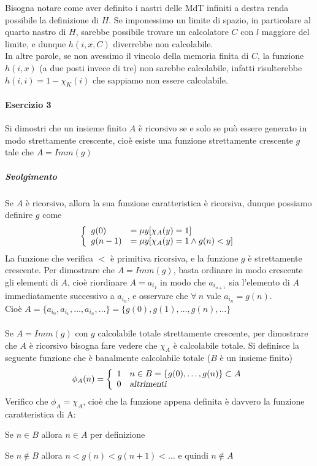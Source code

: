 \documentclass[10pt]{book}
\begin{document}
Bisogna notare come aver definito i nastri delle MdT infiniti a destra renda possibile la definizione di $H$. Se imponessimo un limite di spazio, in particolare al quarto nastro di $H$, sarebbe possibile trovare un calcolatore $C$ con $l$ maggiore del limite, e dunque $h(i,x,C)$ diverrebbe non calcolabile.\\
In altre parole, se non avessimo il vincolo della memoria finita di $C$, la funzione $h(i,x)$ (a due posti invece di tre) non sarebbe calcolabile, infatti risulterebbe $h(i,i) = 1 - \chi_K(i)$ che sappiamo non essere calcolabile.
\paragraph{Esercizio 3} Si dimostri che un insieme finito $A$ è ricorsivo se e solo se può essere generato in modo strettamente crescente, cioè esiste una funzione strettamente crescente $g$ tale che $A = Imm(g)$
\subparagraph{Svolgimento}
Se $A$ è ricorsivo, allora la sua funzione caratteristica è ricorsiva, dunque possiamo definire $g$ come $$\left\{\begin{array}{l l}
g(0)&=\mu y[\chi_A(y) = 1]\\
g(n-1)&=\mu y[\chi_A(y) = 1 \wedge g(n) < y]
\end{array}\right.$$
La funzione che verifica $<$ è primitiva ricorsiva, e la funzione $g$ è strettamente crescente. Per dimostrare che $A = Imm(g)$, basta ordinare in modo crescente gli elementi di $A$, cioè riordinare $A = {a_i}_i$ in modo che $a_{i_{n+1}}$ sia l'elemento di $A$ immediatamente successivo a $a_{i_n}$, e osservare che $\forall\:n$ vale $a_{i_n} = g(n)$.\\
Cioè $A = \{a_{i_0}, a_{i_1}, \ldots, a_{i_n},\ldots\} = \{g(0), g(1),\ldots, g(n),\ldots\}$\\\\
Se $A = Imm(g)$ con $g$ calcolabile totale strettamente crescente, per dimostrare che $A$ è ricorsivo bisogna fare vedere che $\chi_A$ è calcolabile totale. Si definisce la seguente funzione che è banalmente calcolabile totale ($B$ è un insieme finito) $$\phi_A(n) = \left\{\begin{array}{l l}
1&n\in B = \{g(0),\ldots,g(n)\}\subset A\\
0&\textsl{altrimenti}
\end{array}\right.$$
Verifico che $\phi_A = \chi_A$, cioè che la funzione appena definita è davvero la funzione caratteristica di A:
\begin{list}{}{}
	\item Se $n\in B$ allora $n\in A$ per definizione
	\item Se $n\not\in B$ allora $n < g(n) < g(n+1)<\ldots$ e quindi $n\not\in A$
\end{list}
\end{document}
